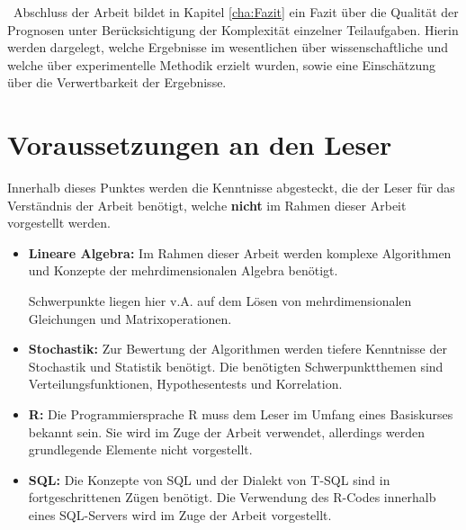 ~\newline Abschluss der Arbeit bildet in Kapitel \ref{cha:Fazit} ein Fazit über die Qualität der Prognosen unter Berücksichtigung der Komplexität einzelner Teilaufgaben. Hierin werden dargelegt, welche Ergebnisse im wesentlichen über wissenschaftliche und welche über experimentelle Methodik erzielt wurden, sowie eine Einschätzung über die Verwertbarkeit der Ergebnisse. 
\newpage
\section{Voraussetzungen an den Leser}
\label{sec:Vorraussetzungen}
Innerhalb dieses Punktes werden die Kenntnisse abgesteckt, die der Leser für das Verständnis der Arbeit benötigt, welche \textbf{nicht} im Rahmen dieser Arbeit vorgestellt werden. 

\begin{itemize}
	\item \textbf{Lineare Algebra:} Im Rahmen dieser Arbeit werden komplexe Algorithmen und Konzepte der mehrdimensionalen Algebra benötigt. 
	
	Schwerpunkte liegen hier v.A. auf dem Lösen von mehrdimensionalen Gleichungen und Matrixoperationen.
	\item \textbf{Stochastik:}  Zur Bewertung der Algorithmen werden tiefere Kenntnisse der Stochastik und Statistik benötigt. Die benötigten Schwerpunktthemen sind Verteilungsfunktionen, Hypothesentests und Korrelation.
	\item \textbf{R:} Die Programmiersprache R muss dem Leser im Umfang eines Basiskurses bekannt sein. Sie wird im Zuge der Arbeit verwendet, allerdings werden grundlegende Elemente nicht vorgestellt. 
	\item \textbf{SQL:} Die Konzepte von SQL und der Dialekt von T-SQL sind in fortgeschrittenen Zügen benötigt. Die Verwendung des R-Codes innerhalb eines SQL-Servers wird im Zuge der Arbeit vorgestellt. 
\end{itemize}
